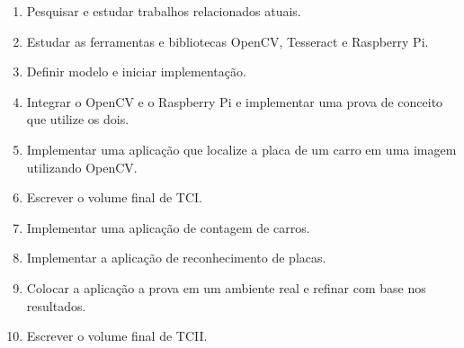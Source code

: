 \begin{enumerate}[I]
	\item Pesquisar e estudar trabalhos relacionados atuais.
	\item Estudar as ferramentas e bibliotecas OpenCV, Tesseract e Raspberry Pi.
	\item Definir modelo e iniciar implementação.
	\item Integrar o OpenCV e o Raspberry Pi e implementar uma prova de conceito que utilize os dois.
	\item Implementar uma aplicação que localize a placa de um carro em uma imagem utilizando OpenCV.
	\item Escrever o volume final de TCI.
	\item Implementar uma aplicação de contagem de carros.
	\item Implementar a aplicação de reconhecimento de placas.
	\item Colocar a aplicação a prova em um ambiente real e refinar com base nos resultados.
	\item Escrever o volume final de TCII.
\end{enumerate}
